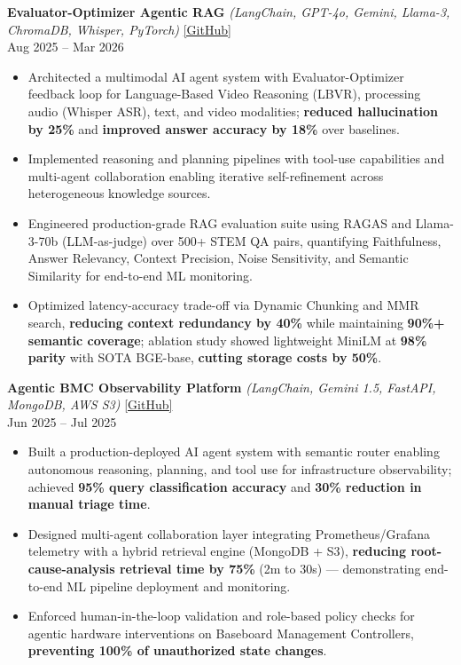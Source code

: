 \documentclass[letterpaper,10.5pt]{extarticle}
\begin{document}
\noindent\textbf{Evaluator-Optimizer Agentic RAG} \textit{(LangChain, GPT-4o, Gemini, Llama-3, ChromaDB, Whisper, PyTorch)} \hfill \href{https://github.com/slowloris-98/Evaluator-Optimizer-RAG}{[GitHub]}\\
Aug 2025 -- Mar 2026

\begin{itemize}[leftmargin=12pt, topsep=1pt, itemsep=0pt, parsep=0pt]
    \item Architected a multimodal AI agent system with Evaluator-Optimizer feedback loop for Language-Based Video Reasoning (LBVR), processing audio (Whisper ASR), text, and video modalities; \textbf{reduced hallucination by 25\%} and \textbf{improved answer accuracy by 18\%} over baselines.
    \item Implemented reasoning and planning pipelines with tool-use capabilities and multi-agent collaboration enabling iterative self-refinement across heterogeneous knowledge sources.
    \item Engineered production-grade RAG evaluation suite using RAGAS and Llama-3-70b (LLM-as-judge) over 500+ STEM QA pairs, quantifying Faithfulness, Answer Relevancy, Context Precision, Noise Sensitivity, and Semantic Similarity for end-to-end ML monitoring.
    \item Optimized latency-accuracy trade-off via Dynamic Chunking and MMR search, \textbf{reducing context redundancy by 40\%} while maintaining \textbf{90\%+ semantic coverage}; ablation study showed lightweight MiniLM at \textbf{98\% parity} with SOTA BGE-base, \textbf{cutting storage costs by 50\%}.
\end{itemize}

\vspace{3pt}

\noindent\textbf{Agentic BMC Observability Platform} \textit{(LangChain, Gemini 1.5, FastAPI, MongoDB, AWS S3)} \hfill \href{https://github.com/slowloris-98/Agentic-Oberservability-BMC}{[GitHub]}\\
Jun 2025 -- Jul 2025

\begin{itemize}[leftmargin=12pt, topsep=1pt, itemsep=0pt, parsep=0pt]
    \item Built a production-deployed AI agent system with semantic router enabling autonomous reasoning, planning, and tool use for infrastructure observability; achieved \textbf{95\% query classification accuracy} and \textbf{30\% reduction in manual triage time}.
    \item Designed multi-agent collaboration layer integrating Prometheus/Grafana telemetry with a hybrid retrieval engine (MongoDB + S3), \textbf{reducing root-cause-analysis retrieval time by 75\%} (2m to 30s) --- demonstrating end-to-end ML pipeline deployment and monitoring.
    \item Enforced human-in-the-loop validation and role-based policy checks for agentic hardware interventions on Baseboard Management Controllers, \textbf{preventing 100\% of unauthorized state changes}.
\end{itemize}
\end{document}
